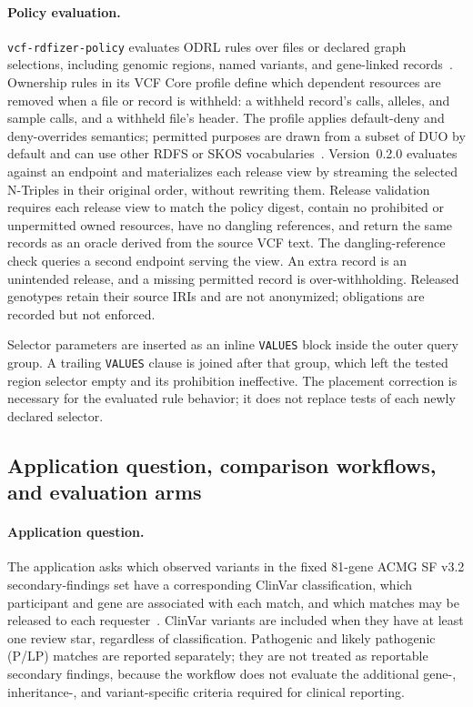 \documentclass[11pt]{article}
\begin{document}
\paragraph{Policy evaluation.}
\texttt{vcf-rdfizer-policy} evaluates ODRL rules over files or declared graph selections, including genomic regions, named variants, and gene-linked records~\cite{odrl_2018}.
Ownership rules in its VCF Core profile define which dependent resources are removed when a file or record is withheld: a withheld record's calls, alleles, and sample calls, and a withheld file's header.
The profile applies default-deny and deny-overrides semantics; permitted purposes are drawn from a subset of DUO by default and can use other RDFS or SKOS vocabularies~\cite{lawson2021duo}.
Version~0.2.0 evaluates against an endpoint and materializes each release view by streaming the selected N-Triples in their original order, without rewriting them.
Release validation requires each release view to match the policy digest, contain no prohibited or unpermitted owned resources, have no dangling references, and return the same records as an oracle derived from the source VCF text.
The dangling-reference check queries a second endpoint serving the view.
An extra record is an unintended release, and a missing permitted record is over-withholding.
Released genotypes retain their source IRIs and are not anonymized; obligations are recorded but not enforced.

Selector parameters are inserted as an inline \texttt{VALUES} block inside the outer query group.
A trailing \texttt{VALUES} clause is joined after that group, which left the tested region selector empty and its prohibition ineffective.
The placement correction is necessary for the evaluated rule behavior; it does not replace tests of each newly declared selector.

\subsection{Application question, comparison workflows, and evaluation arms}\label{subsec:usecase-case}
\paragraph{Application question.}
The application asks which observed variants in the fixed 81-gene ACMG SF v3.2 secondary-findings set have a corresponding ClinVar classification, which participant and gene are associated with each match, and which matches may be released to each requester~\cite{miller2023acmg}.
ClinVar variants are included when they have at least one review star, regardless of classification.
Pathogenic and likely pathogenic (P/LP) matches are reported separately; they are not treated as reportable secondary findings, because the workflow does not evaluate the additional gene-, inheritance-, and variant-specific criteria required for clinical reporting.
\end{document}
